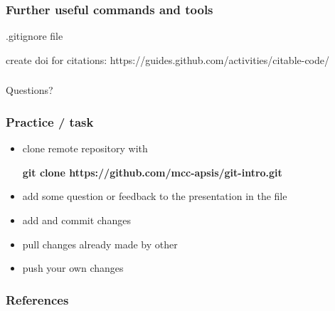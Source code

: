 \documentclass{beamer}
\newcommand{\code}[1]{{\fontfamily{pcr}\selectfont \textbf{#1}}}
\begin{document}
\begin{frame}
\frametitle{Further useful commands and tools}

.gitignore file

create doi for citations:
https://guides.github.com/activities/citable-code/

\end{frame}

\begin{frame}
\frametitle{}

{\huge
Questions?
}

\end{frame}

\begin{frame}
\frametitle{Practice / task}

\begin{itemize}
\item clone remote repository with

\code{git clone https://github.com/mcc-apsis/git-intro.git}

\item add some question or feedback to the presentation in the file

\item add and commit changes

\item pull changes already made by other

\item push your own changes
\end{itemize}




\end{frame}


\begin{frame}
\frametitle{References}



\end{frame}
\end{document}
